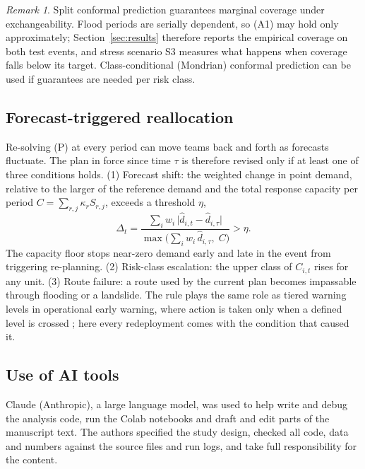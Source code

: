 \documentclass[pdflatex,sn-basic]{sn-jnl}
\theoremstyle{plain}%
\theoremstyle{remark}%
\newtheorem{remark}{Remark}%
\theoremstyle{definition}%
\begin{document}
\begin{remark}
Split conformal prediction guarantees marginal coverage under exchangeability. Flood periods are serially dependent, so (A1) may hold only approximately; Section~\ref{sec:results} therefore reports the empirical coverage on both test events, and stress scenario S3 measures what happens when coverage falls below its target. Class-conditional (Mondrian) conformal prediction can be used if guarantees are needed per risk class.
\end{remark}

\subsection{Forecast-triggered reallocation}\label{sec:trigger}

Re-solving (P) at every period can move teams back and forth as forecasts fluctuate. The plan in force since time $\tau$ is therefore revised only if at least one of three conditions holds. (1) Forecast shift: the weighted change in point demand, relative to the larger of the reference demand and the total response capacity per period $C = \sum_{r,j}\kappa_r S_{r,j}$, exceeds a threshold $\eta$,
\begin{equation}
\Delta_t = \frac{\sum_i w_i\,\lvert \hat d_{i,t} - \hat d_{i,\tau} \rvert}{\max\big(\sum_i w_i\, \hat d_{i,\tau},\; C\big)} > \eta .
\label{eq:trigger}
\end{equation}
The capacity floor stops near-zero demand early and late in the event from triggering re-planning. (2) Risk-class escalation: the upper class of $C_{i,t}$ rises for any unit. (3) Route failure: a route used by the current plan becomes impassable through flooding or a landslide. The rule plays the same role as tiered warning levels in operational early warning, where action is taken only when a defined level is crossed \citep{Metodiev2026}; here every redeployment comes with the condition that caused it.

\subsection{Use of AI tools}

Claude (Anthropic), a large language model, was used to help write and debug the analysis code, run the Colab notebooks and draft and edit parts of the manuscript text. The authors specified the study design, checked all code, data and numbers against the source files and run logs, and take full responsibility for the content.
\end{document}
